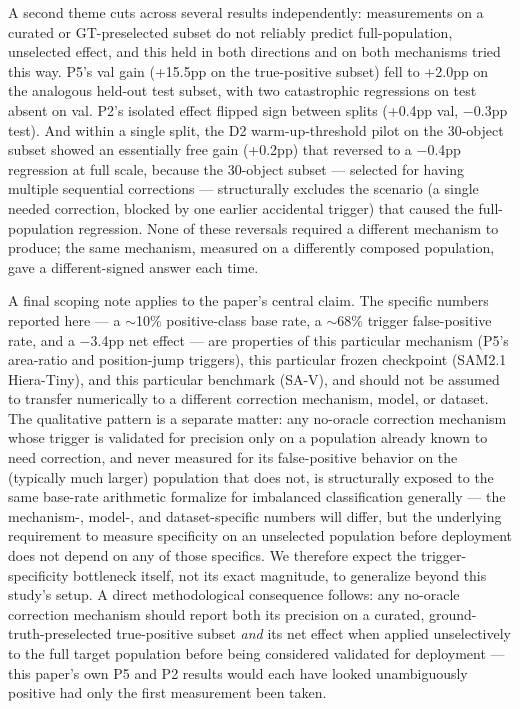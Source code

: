 \documentclass[11pt]{article}
\begin{document}
A second theme cuts across several results independently: measurements on a curated or GT-preselected subset do not reliably predict full-population, unselected effect, and this held in both directions and on both mechanisms tried this way. P5's val gain (+15.5pp on the true-positive subset) fell to +2.0pp on the analogous held-out test subset, with two catastrophic regressions on test absent on val. P2's isolated effect flipped sign between splits (+0.4pp val, $-$0.3pp test). And within a single split, the D2 warm-up-threshold pilot on the 30-object subset showed an essentially free gain (+0.2pp) that reversed to a $-$0.4pp regression at full scale, because the 30-object subset — selected for having multiple sequential corrections — structurally excludes the scenario (a single needed correction, blocked by one earlier accidental trigger) that caused the full-population regression. None of these reversals required a different mechanism to produce; the same mechanism, measured on a differently composed population, gave a different-signed answer each time.

A final scoping note applies to the paper's central claim. The specific numbers reported here — a $\sim$10\% positive-class base rate, a $\sim$68\% trigger false-positive rate, and a $-$3.4pp net effect — are properties of this particular mechanism (P5's area-ratio and position-jump triggers), this particular frozen checkpoint (SAM2.1 Hiera-Tiny), and this particular benchmark (SA-V), and should not be assumed to transfer numerically to a different correction mechanism, model, or dataset. The qualitative pattern is a separate matter: any no-oracle correction mechanism whose trigger is validated for precision only on a population already known to need correction, and never measured for its false-positive behavior on the (typically much larger) population that does not, is structurally exposed to the same base-rate arithmetic \citet{saito2015} formalize for imbalanced classification generally — the mechanism-, model-, and dataset-specific numbers will differ, but the underlying requirement to measure specificity on an unselected population before deployment does not depend on any of those specifics. We therefore expect the trigger-specificity bottleneck itself, not its exact magnitude, to generalize beyond this study's setup. A direct methodological consequence follows: any no-oracle correction mechanism should report both its precision on a curated, ground-truth-preselected true-positive subset \emph{and} its net effect when applied unselectively to the full target population before being considered validated for deployment — this paper's own P5 and P2 results would each have looked unambiguously positive had only the first measurement been taken.
\end{document}
